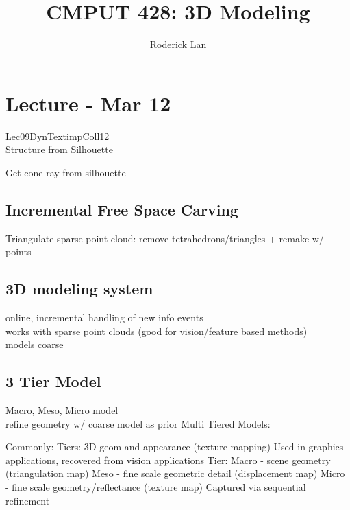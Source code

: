 \documentclass{article}
\title{CMPUT 428: 3D Modeling}
\author{Roderick Lan}
\date{}
\begin{document}
\makeatother
{}

\maketitle
\tableofcontents
\break

\section{Lecture - Mar 12}
Lec09DynTextimpColl12\\[10pt]
Structure from Silhouette
\begin{list}{}{}
  \item Get cone ray from silhouette
\end{list}

\subsection{Incremental Free Space Carving}
Triangulate sparse point cloud: remove tetrahedrons/triangles + remake w/ points

\subsection{3D modeling system}
online, incremental handling of new info events
\\
works with sparse point clouds (good for vision/feature based methods)
\\
models coarse


\subsection{3 Tier Model}
Macro, Meso, Micro model
\\
refine geometry w/ coarse model as prior
\noindent
Multi Tiered Models:
\begin{outline}
  \1 Commonly:
     Tiers: 3D geom and appearance (texture mapping)
    \2 Used in graphics applications, recovered from vision applications
   Tier:
    \2 Macro - scene geometry (triangulation map)
    \2 Meso - fine scale geometric detail (displacement map)
    \3 Micro - fine scale geometry/reflectance (texture map)
  \1 Captured via sequential refinement
\end{outline}
\end{document}
